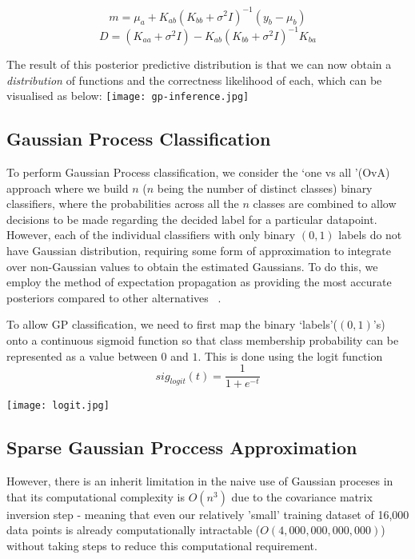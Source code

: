\documentclass[10pt,sts]{article}
\begin{document}
\begin{multicols}{2}
    $$ m = \mu_a + K_{ab} (K_{bb} + \sigma^2I)^{-1} (y_b - \mu_b) $$
    $$ D = (K_{aa} + \sigma^2I) - K_{ab} (K_{bb}+\sigma^2I)^{-1} K_{ba} $$

    The result of this posterior predictive distribution is that we can now obtain a \textit{distribution} of functions and the correctness likelihood of each, which can be visualised as below:
    \texttt{[image: gp-inference.jpg]}

    \subsection{Gaussian Process Classification} 
    To perform Gaussian Process classification, we consider the \lq one vs all \rq (OvA) approach where we build $n$ ($n$ being the number of distinct classes) binary classifiers, where the probabilities across all the $n$ classes are combined to allow decisions to be made regarding the decided label for a particular datapoint. However, each of the individual classifiers with only binary $(0, 1)$ labels do not have Gaussian distribution, requiring some form of approximation to integrate over non-Gaussian values to obtain the estimated Gaussians. To do this, we employ the method of expectation propagation as providing the most accurate posteriors compared to other alternatives ~\citep{nickisch08}. 

    To allow GP classification, we need to first map the binary \lq labels\rq ($(0, 1)$'s) onto a continuous sigmoid function so that class membership probability can be represented as a value between $0$ and $1$. This is done using the logit function $$sig_{logit}(t) = \frac{1}{1+e^{-t}}$$
    
    \texttt{[image: logit.jpg]}

    \subsection{Sparse Gaussian Proccess Approximation} However, there is an inherit limitation in the naive use of Gaussian proceses in that its computational complexity is $O(n^3)$ due to the covariance matrix inversion step - meaning that even our relatively 'small' training dataset of 16,000 data points is already computationally intractable ($O(4,000,000,000,000)$) without taking steps to reduce this computational requirement.


\end{multicols}
\end{document}

